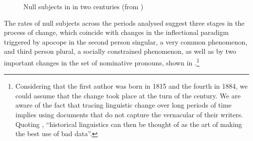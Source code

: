 \documentclass[output=paper]{langsci/langscibook}
\begin{document}
\begin{figure}[t]
    \pgfplotstablegetcolsof{\table}
    \pgfmathtruncatemacro{}
\caption{Null subjects in  in two centuries
(from \citealt{Duarte1993})\label{fig:26.1}}
\end{figure}

The rates of null subjects across the periods analysed suggest three stages in
the process of change, which coincide with changes in the inflectional paradigm
triggered by apocope in the second person singular, a very common phenomenon,
and third person plural, a socially constrained phenomenon, as well as by two
important changes in the set of nominative pronouns, shown in
.\footnote{Considering that the first author was born in
    1815 and the fourth in 1884, we could assume that the change took place at
    the turn of the century. We are aware of the fact that tracing linguistic
    change over long periods of time implies using documents that do not
    capture the vernacular of their writers. Quoting
    \parencite[11]{Labov1994}, “historical linguistics can then be thought of
    as the art of making the best use of bad data”.}
\end{document}
